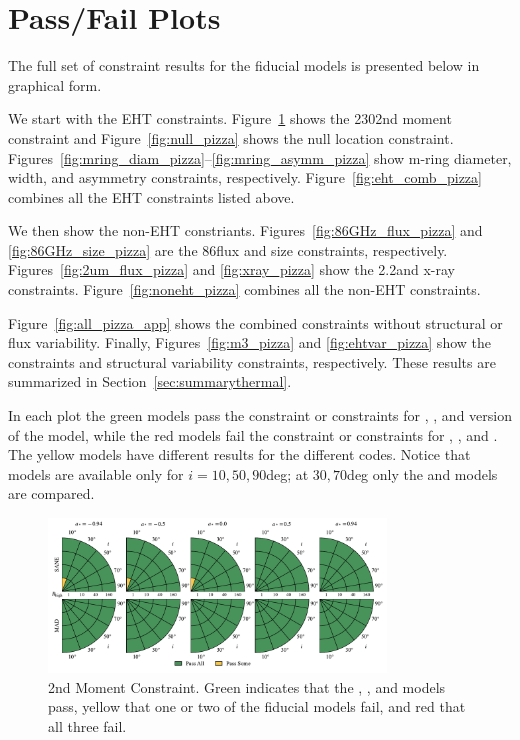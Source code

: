 \section{Pass/Fail Plots}\label{app:tables}

The full set of constraint results for the fiducial models is presented below in graphical form.

﻿We start with the EHT constraints.
﻿Figure~\ref{fig:230GHz_size_pizza} shows the 230\GHz 2nd moment constraint and
Figure~\ref{fig:null_pizza} shows the null location constraint.
Figures~\ref{fig:mring_diam_pizza}--\ref{fig:mring_asymm_pizza} show m-ring diameter, width, and asymmetry constraints, respectively.
Figure~\ref{fig:eht_comb_pizza} combines all the EHT constraints listed above.

﻿We then ﻿show the non-EHT constriants.
Figures~\ref{fig:86GHz_flux_pizza} and \ref{fig:86GHz_size_pizza} are the 86\GHz flux and size constraints, respectively.
Figures~\ref{fig:2um_flux_pizza} and \ref{fig:xray_pizza} show the 2.2\um and x-ray constraints.
Figure~\ref{fig:noneht_pizza} combines all the non-EHT constraints.

Figure~\ref{fig:all_pizza_app} shows the ﻿combined constraints without structural or flux variability.
Finally, Figures~\ref{fig:m3_pizza} and \ref{fig:ehtvar_pizza} show the \mi constraints and structural variability constraints, respectively.
These results are summarized in Section~\ref{sec:summarythermal}.

In each plot the green models pass the constraint or constraints for \kharma, \bhac, and \hamr version of the model, while the red models fail the constraint or constraints for \kharma, \bhac, and \hamr.
The yellow models have different results for the different codes.
Notice that \hamr models are available only for $i = 10, 50, 90$deg; at $30, 70$deg only the \kharma and \bhac models are compared.


\begin{figure}
  \centering
  \includegraphics[width=0.8\textwidth]{./figures/230GHz_size_Constraints.pdf}
  \caption{2nd Moment Constraint.  Green indicates that the \kharma, \bhac, and \hamr models pass, yellow that one or two of the fiducial models fail, and red that all three fail.}
  \label{fig:230GHz_size_pizza}
\end{figure}

